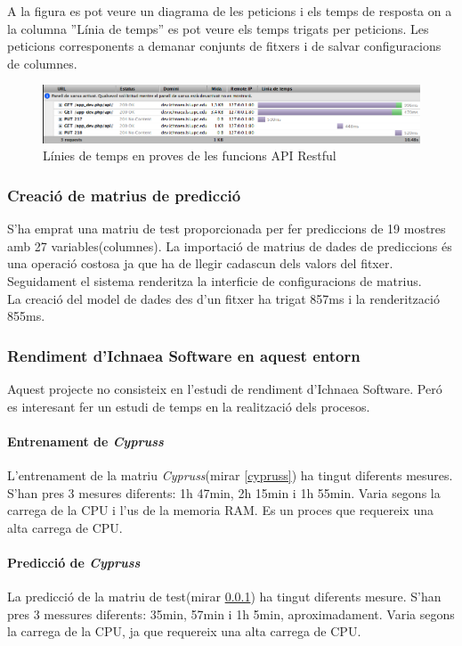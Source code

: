 A la figura  es pot veure un diagrama de les peticions i els temps de resposta on a la columna ''Línia de temps'' es pot veure els temps trigats per peticions. Les peticions corresponents a demanar conjunts de fitxers i de salvar configuracions de columnes.
\begin{figure}[h]
  \includegraphics[scale=0.4]{img/test/firebugAPI.png}
  \caption{Línies de temps en proves de les funcions API Restful}
  \label{fig:firebugAPI}
\end{figure}


\subsubsection{Creaci\'{o} de matrius de predicci\'{o}}
\label{cypruss_test}
S'ha emprat una matriu de test proporcionada per fer prediccions de 19 mostres amb 27 variables(columnes). La importaci\'{o} de matrius de dades de prediccions \'{e}s una operaci\'{o} costosa ja que ha de llegir cadascun dels valors del fitxer. Seguidament el sistema renderitza la interficie de configuracions de matrius.\\

La creaci\'{o} del model de dades des d'un fitxer ha trigat 857ms i la renderitzaci\'{o} 855ms.

\subsubsection{Rendiment d'Ichnaea Software en aquest entorn}
Aquest projecte no consisteix en l'estudi de rendiment d'Ichnaea Software. Per\'{o} es interesant fer un estudi de temps en la realitzaci\'{o} dels procesos.

\paragraph{Entrenament de \textit{Cypruss}}
L'entrenament de la matriu \textit{Cypruss}(mirar \ref{cypruss}) ha tingut diferents mesures. S'han pres 3 mesures diferents: 1h 47min, 2h 15min i 1h 55min. Varia segons la carrega de la CPU i l'us de la memoria RAM. Es un proces que requereix una alta carrega de CPU.

\paragraph{Predicci\'{o} de \textit{Cypruss}}
La predicci\'{o} de la matriu de test(mirar \ref{cypruss_test}) ha tingut diferents mesure. S'han pres 3 messures diferents: 35min, 57min i 1h 5min, aproximadament. Varia segons la carrega de la CPU, ja que requereix una alta carrega de CPU.

